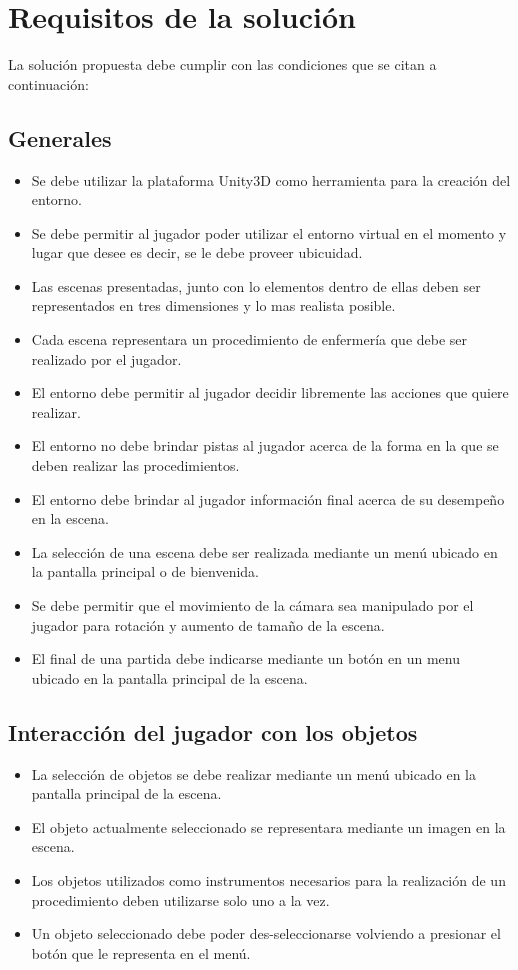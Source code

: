 \section{Requisitos de la solución}
\label{sec:problema_requisitos}

La solución propuesta debe cumplir con las condiciones que se citan a continuación:

\subsection{Generales}
\begin{itemize}
\item Se debe utilizar la plataforma Unity3D como herramienta para la creación del entorno.
\item Se debe permitir al jugador poder utilizar el entorno virtual en el momento y lugar que desee es decir, 
se le debe proveer ubicuidad.
\item Las escenas presentadas, junto con lo elementos dentro de ellas deben ser representados en tres dimensiones y
lo mas realista posible.
\item Cada escena representara un procedimiento de enfermería que debe ser realizado por el jugador.
\item El entorno debe permitir al jugador decidir libremente las acciones que quiere realizar.
\item El entorno no debe brindar pistas al jugador acerca de la forma en la que se deben realizar las procedimientos.
\item El entorno debe brindar al jugador información final acerca de su desempeño en la escena.
\item La selección de una escena debe ser realizada mediante un menú ubicado en la pantalla principal o de bienvenida.
\item Se debe permitir que el movimiento de la cámara sea manipulado por el jugador para rotación y aumento de tamaño de la escena.
\item El final de una partida debe indicarse mediante un botón en un menu ubicado en la pantalla principal de la escena.
\end{itemize}

\subsection{Interacción del jugador con los objetos}
\begin{itemize}
\item La selección de objetos se debe realizar mediante un menú ubicado en la pantalla principal de la escena.
\item El objeto actualmente seleccionado se representara mediante un imagen en la escena.
\item Los objetos utilizados como instrumentos necesarios para la realización de un procedimiento deben
utilizarse solo uno a la vez.
\item Un objeto seleccionado debe poder des-seleccionarse volviendo a presionar el botón que le representa en el 
menú.
\end{itemize}

